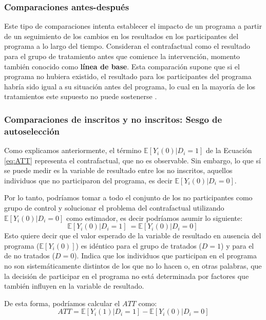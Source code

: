 \documentclass[../../main.tex]{subfiles}
\begin{document}
\subsubsection{Comparaciones antes-después}
Este tipo de comparaciones intenta establecer el impacto de un programa a partir de un
seguimiento de los cambios en los resultados en los participantes del programa a lo largo
del tiempo. Consideran el contrafactual como el resultado para el grupo de tratamiento
antes que comience la intervención, momento también conocido como \textbf{línea de base}.
Esta comparación supone que si el programa no hubiera existido, el resultado para los
participantes del programa habría sido igual a su situación antes del programa, lo cual en
la mayoría de los tratamientos este supuesto no puede sostenerse \cite{gertler-2016}.

\subsubsection{Comparaciones de inscritos y no inscritos: Sesgo de autoselección}
Como explicamos anteriormente, el término \(\mathbb{E} \left[Y_i(0)|D_i=1\right]\) de la
Ecuación \ref{eq:ATT} representa el contrafactual, que no es observable. Sin embargo, lo
que sí se puede medir es la variable de resultado entre los no inscritos, aquellos
individuos que no participaron del programa, es decir \(\mathbb{E}
\left[Y_i(0)|D_i=0\right]\).

Por lo tanto, podríamos tomar a todo el conjunto de los no participantes como grupo de
control y solucionar el problema del contrafactual utilizando \(\mathbb{E}
\left[Y_i(0)|D_i=0\right]\) como estimador, es decir podríamos asumir lo siguiente:
\begin{equation}
    \mathbb{E} \left[Y_i(0)|D_i=1\right]\ = \mathbb{E} \left[Y_i(0)|D_i=0\right]\
    \label{eq:supuesto-1}  %
\end{equation}
Esto quiere decir que el valor esperado de la variable de resultado en ausencia del
programa (\(\mathbb{E}\left[Y_i(0)\right]\)) es idéntico para el grupo de tratados (\(D =
1\)) y para el de no tratados (\(D = 0\)). Indica que los individuos que participan en el
programa no son sistemáticamente distintos de los que no lo hacen \cite{bernal} o, en
otras palabras, que la decisión de participar en el programa no está determinada por
factores que también influyen en la variable de resultado.

De esta forma, podríamos calcular el \(ATT\) como:
\begin{equation}
    ATT = \mathbb{E} \left[Y_i(1)|D_i=1\right] - \mathbb{E} \left[Y_i(0)|D_i=0\right]
    \label{eq:ATT-con-supuesto-IC}
\end{equation}
\end{document}
